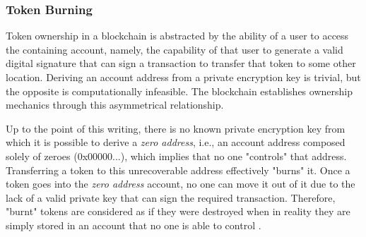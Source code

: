 \documentclass[../3_VotingAndNFTs.tex]{subfiles}
\begin{document}
\subsubsection{Token Burning}
Token ownership in a blockchain is abstracted by the ability of a user to access the containing account, namely, the capability of that user to generate a valid digital signature that can sign a transaction to transfer that token to some other location. Deriving an account address from a private encryption key is trivial, but the opposite is computationally infeasible. The blockchain establishes ownership mechanics through this asymmetrical relationship.
\par
Up to the point of this writing, there is no known private encryption key from which it is possible to derive a \textit{zero address}, i.e., an account address composed solely of zeroes (0x00000...), which implies that no one "controls" that address. Transferring a token to this unrecoverable address effectively "burns" it. Once a token goes into the \textit{zero address} account, no one can move it out of it due to the lack of a valid private key that can sign the required transaction. Therefore, "burnt" tokens are considered as if they were destroyed when in reality they are simply stored in an account that no one is able to control \cite{Antonopoulos2018}.
\end{document}
